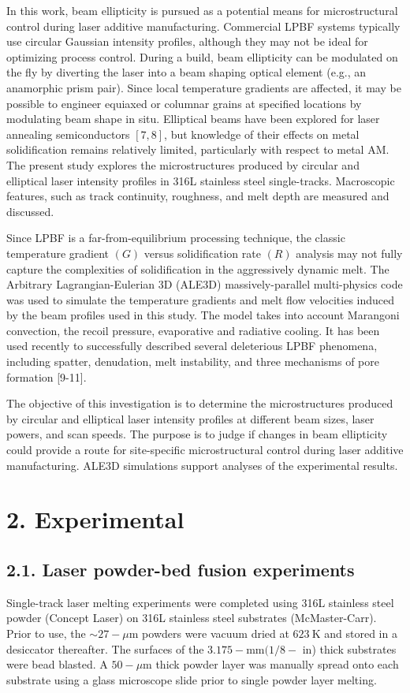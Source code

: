 \documentclass[10pt]{article}
\begin{document}
In this work, beam ellipticity is pursued as a potential means for microstructural control during laser additive manufacturing. Commercial LPBF systems typically use circular Gaussian intensity profiles, although they may not be ideal for optimizing process control. During a build, beam ellipticity can be modulated on the fly by diverting the laser into a beam shaping optical element (e.g., an anamorphic prism pair). Since local temperature gradients are affected, it may be possible to engineer equiaxed or columnar grains at specified locations by modulating beam shape in situ. Elliptical beams have been explored for laser annealing semiconductors $[7,8]$, but knowledge of their effects on metal solidification remains relatively limited, particularly with respect to metal AM. The present study explores the microstructures produced by circular and elliptical laser intensity profiles in 316L stainless steel single-tracks. Macroscopic features, such as track continuity, roughness, and melt depth are measured and discussed.

Since LPBF is a far-from-equilibrium processing technique, the classic temperature gradient $(G)$ versus solidification rate $(R)$ analysis may not fully capture the complexities of solidification in the aggressively dynamic melt. The Arbitrary Lagrangian-Eulerian 3D (ALE3D) massively-parallel multi-physics code was used to simulate the temperature gradients and melt flow velocities induced by the beam profiles used in this study. The model takes into account Marangoni convection, the recoil pressure, evaporative and radiative cooling. It has been used recently to successfully described several deleterious LPBF phenomena, including spatter, denudation, melt instability, and three mechanisms of pore formation [9-11].

The objective of this investigation is to determine the microstructures produced by circular and elliptical laser intensity profiles at different beam sizes, laser powers, and scan speeds. The purpose is to judge if changes in beam ellipticity could provide a route for site-specific microstructural control during laser additive manufacturing. ALE3D simulations support analyses of the experimental results.

\section*{2. Experimental}
\subsection*{2.1. Laser powder-bed fusion experiments}
Single-track laser melting experiments were completed using 316L stainless steel powder (Concept Laser) on 316L stainless steel substrates (McMaster-Carr). Prior to use, the $\sim 27-\mu \mathrm{m}$ powders were vacuum dried at $623 \mathrm{~K}$ and stored in a desiccator thereafter. The surfaces of the $3.175-\mathrm{mm}(1 / 8-$ in) thick substrates were bead blasted. A $50-\mu \mathrm{m}$ thick powder layer was manually spread onto each substrate using a glass microscope slide prior to single powder layer melting.
\end{document}
